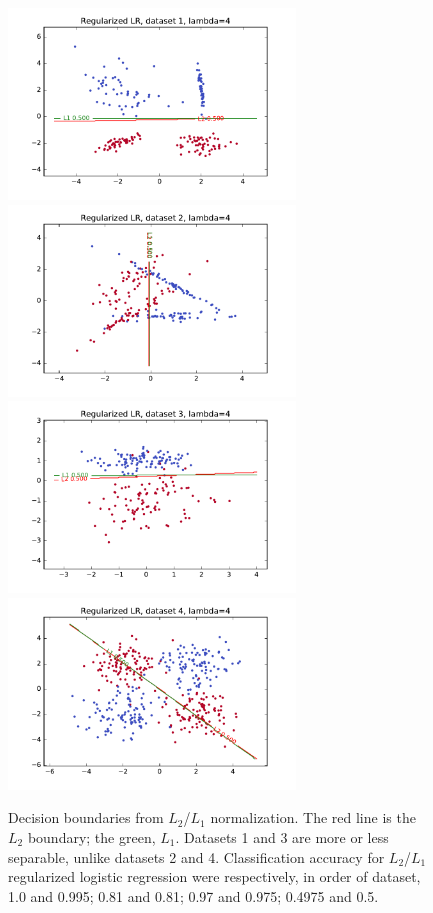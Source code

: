 \documentclass{article}
\begin{document}
\begin{multicols}{2}
\begin{figure}
   \centering
   \includegraphics[width=3in]{img/1-3-1.pdf}
   \includegraphics[width=3in]{img/1-3-2.pdf}
   \includegraphics[width=3in]{img/1-3-3.pdf}
   \includegraphics[width=3in]{img/1-3-4.pdf}
   \caption{Decision boundaries from $L_2$/$L_1$ normalization.
       The red line is the $L_2$ boundary; the green, $L_1$.
       Datasets 1 and 3 are more or less separable,
       unlike datasets 2 and 4.
       Classification accuracy for
       $L_2$/$L_1$ regularized logistic regression
       were respectively,
       in order of dataset,
       1.0 and 0.995; 0.81 and 0.81; 0.97 and 0.975; 0.4975 and 0.5.}
   \label{fig:1-3-boundaries}
\end{figure}


\end{multicols}
\end{document}
